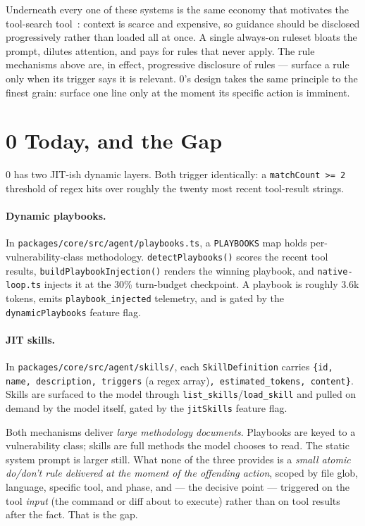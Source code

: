 \documentclass[11pt]{article}
\begin{document}
Underneath every one of these systems is the same economy that motivates the
tool-search tool~\cite{toolsearch}: context is scarce and expensive, so
guidance should be disclosed progressively rather than loaded all at once. A
single always-on ruleset bloats the prompt, dilutes attention, and pays for
rules that never apply. The rule mechanisms above are, in effect, progressive
disclosure of rules --- surface a rule only when its trigger says it is relevant.
0's design takes the same principle to the finest grain: surface one line only
at the moment its specific action is imminent.

\section{0 Today, and the Gap}
\label{sec:gap}

0 has two JIT-ish dynamic layers. Both trigger identically: a
\texttt{matchCount >= 2} threshold of regex hits over roughly the twenty most
recent tool-result strings.

\paragraph{Dynamic playbooks.} In
\texttt{packages/core/src/agent/playbooks.ts}, a \texttt{PLAYBOOKS} map holds
per-vulnerability-class methodology. \texttt{detectPlaybooks()} scores the recent
tool results, \texttt{buildPlaybookInjection()} renders the winning playbook, and
\texttt{native-loop.ts} injects it at the 30\% turn-budget checkpoint. A playbook
is roughly 3.6k tokens, emits \texttt{playbook\_injected} telemetry, and is gated
by the \texttt{dynamicPlaybooks} feature flag.

\paragraph{JIT skills.} In \texttt{packages/core/src/agent/skills/}, each
\texttt{SkillDefinition} carries \texttt{\{id, name, description, triggers}
(a regex array)\texttt{, estimated\_tokens, content\}}. Skills are surfaced to the
model through \texttt{list\_skills}/\texttt{load\_skill} and pulled on demand by
the model itself, gated by the \texttt{jitSkills} feature flag.

Both mechanisms deliver \emph{large methodology documents}. Playbooks are keyed
to a vulnerability class; skills are full methods the model chooses to read. The
static system prompt is larger still. What none of the three provides is a
\emph{small atomic do/don't rule delivered at the moment of the offending
action}, scoped by file glob, language, specific tool, and phase, and --- the
decisive point --- triggered on the tool \emph{input} (the command or diff about
to execute) rather than on tool results after the fact. That is the gap.
\end{document}
